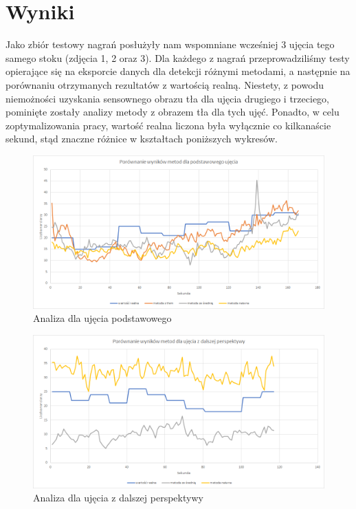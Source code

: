 \documentclass[a4paper]{article}
\begin{document}
\section{Wyniki}
Jako zbiór testowy nagrań posłużyły nam wspomniane wcześniej 3 ujęcia tego samego stoku (zdjęcia 1, 2 oraz 3). Dla każdego z nagrań przeprowadziliśmy testy opierające się na eksporcie danych dla detekcji różnymi metodami, a następnie na porównaniu otrzymanych rezultatów z wartością realną. Niestety, z powodu niemożności uzyskania sensownego obrazu tła dla ujęcia drugiego i trzeciego, pominięte zostały analizy metody z obrazem tła dla tych ujęć. Ponadto, w celu zoptymalizowania pracy, wartość realna liczona była wyłącznie co kilkanaście sekund, stąd znaczne różnice w kształtach poniższych wykresów.\\
\begin{figure}[H]
  \includegraphics[width=\linewidth]{resources/img8.png}
  \caption{Analiza dla ujęcia podstawowego}
\end{figure}
\begin{figure}[H]
  \includegraphics[width=\linewidth]{resources/img9.png}
  \caption{Analiza dla ujęcia z dalszej perspektywy}
\end{figure}
\end{document}
